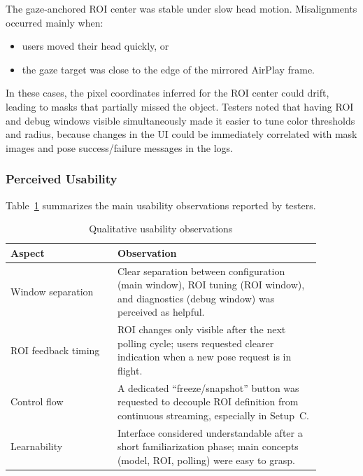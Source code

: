The gaze-anchored ROI center was stable under slow head motion. Misalignments occurred mainly when:

\begin{itemize}
    \item users moved their head quickly, or
    \item the gaze target was close to the edge of the mirrored AirPlay frame.
\end{itemize}

In these cases, the pixel coordinates inferred for the ROI center could drift, leading to masks that partially missed the object. Testers noted that having ROI and debug windows visible simultaneously made it easier to tune color thresholds and radius, because changes in the UI could be immediately correlated with mask images and pose success/failure messages in the logs.

\subsubsection{Perceived Usability}

Table~\ref{tab:ux-findings-eval} summarizes the main usability observations reported by testers.

\begin{table}[H]
    \centering
    \caption{Qualitative usability observations}
    \label{tab:ux-findings-eval}
    \begin{tabular}{p{0.30\linewidth}p{0.58\linewidth}}
        \toprule
        \textbf{Aspect} & \textbf{Observation} \\
        \midrule
        Window separation &
        Clear separation between configuration (main window), ROI tuning (ROI window), and diagnostics (debug window) was perceived as helpful. \\
        ROI feedback timing &
        ROI changes only visible after the next polling cycle; users requested clearer indication when a new pose request is in flight. \\
        Control flow &
        A dedicated “freeze/snapshot” button was requested to decouple ROI definition from continuous streaming, especially in Setup~C. \\
        Learnability &
        Interface considered understandable after a short familiarization phase; main concepts (model, ROI, polling) were easy to grasp. \\
        \bottomrule
    \end{tabular}
\end{table}

